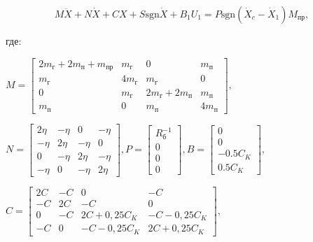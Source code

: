 $$ M \ddot X + N \dot X + CX + S \text{sgn} \dot X + B_1U_1 = P \text{sgn} ( \dot X_c - \dot X_1 ) M_{\text{пр}}, $$

где:

$ 
M = 
\begin{bmatrix}
	2m_{\text{г}} + 2m_{\text{п}} + m_{\text{пр}} & m_{\text{г}}   & 0                               & m_{\text{п}}   \\
	m_{\text{г}}                                  & 4 m_{\text{г}} & m_{\text{г}}                    & 0              \\
	0                                             & m_{\text{г}}   & 2 m_{\text{г}} + 2 m_{\text{п}} & m_{\text{п}}   \\
	m_{\text{п}}                                  & 0              & m_{\text{п}}                    & 4 m_{\text{п}} 
\end{bmatrix},
$
\bigskip

$
N = 
\begin{bmatrix}
	2 \eta & - \eta & 0      & - \eta \\
	- \eta & 2 \eta & - \eta & 0      \\
	0      & - \eta & 2 \eta & - \eta \\
	- \eta & 0      & - \eta & 2 \eta                                   
\end{bmatrix}, P = 
\begin{bmatrix}
	R_{\text{б}}^{-1}                 \\
	0                                 \\
	0                                 \\
	0                      
\end{bmatrix}, B = 
\begin{bmatrix}
	0                                 \\
	0                                 \\
	-0.5C_K                           \\
	0.5C_K
\end{bmatrix},
$
\bigskip

$ 
C = 
\begin{bmatrix}
	2C & -C & 0             & -C            \\
	-C & 2C & -C            & 0             \\
	0  & -C & 2C + 0,25C_K  & -C - 0,25 C_K \\
	-C & 0  & -C - 0,25 C_K & 2C + 0,25C_K   
\end{bmatrix},
$
\bigskip

